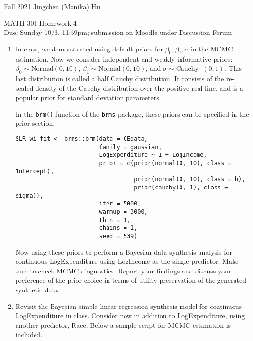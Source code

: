 \documentclass[11pt]{article}
\begin{document}
\enlargethispage{\baselineskip}

Fall 2021 \hfill Jingchen (Monika) Hu\\

\begin{center}
{\huge MATH 301 Homework 4}	\\
Due: Sunday 10/3, 11:59pm; submission on Moodle under Discussion Forum
\end{center}
\vspace{0.5cm}

\begin{enumerate}
\item In class, we demonstrated using default priors for ${\beta_0, \beta_1, \sigma}$ in the MCMC estimation. Now we consider independent and weakly informative priors: $\beta_0 \sim \textrm{Normal}(0, 10)$, $\beta_1 \sim \textrm{Normal}(0, 10)$, and $\sigma \sim \textrm{Cauchy}^+(0 ,1)$. This last distribution is called a half Cauchy distribution. It consists of the re-scaled density of the Cauchy distribution over the positive real line, and is a popular prior for standard deviation parameters.

In the \texttt{brm()} function of the \texttt{brms} package, these priors can be specified in the prior section.

\begin{verbatim}
SLR_wi_fit <- brms::brm(data = CEdata,
                        family = gaussian,
                        LogExpenditure ~ 1 + LogIncome,
                        prior = c(prior(normal(0, 10), class = Intercept),
                                  prior(normal(0, 10), class = b),
                                  prior(cauchy(0, 1), class = sigma)),
                        iter = 5000, 
                        warmup = 3000, 
                        thin = 1, 
                        chains = 1, 
                        seed = 539)
\end{verbatim}


Now using these priors to perform a Bayesian data synthesis analysis for continuous LogExpenditure using LogIncome as the single predictor. Make sure to check MCMC diagnostics. Report your findings and discuss your preference of the prior choice in terms of utility preservation of the generated synthetic data.


\item Revisit the Bayesian simple linear regression synthesis model for continuous LogExpenditure in class. Consider now in addition to LogExpenditure, using another predictor, Race. Below a sample script for MCMC estimation is included. 


\end{enumerate}
\end{document}

